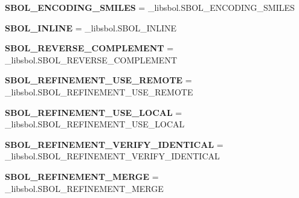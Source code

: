 \begin{DoxyCompactItemize}
\item 
{\bfseries S\+B\+O\+L\+\_\+\+E\+N\+C\+O\+D\+I\+N\+G\+\_\+\+S\+M\+I\+L\+ES} = \+\_\+libsbol.\+S\+B\+O\+L\+\_\+\+E\+N\+C\+O\+D\+I\+N\+G\+\_\+\+S\+M\+I\+L\+ES\hypertarget{namespacesbol_1_1libsbol_aba484650567bce0b94f19ad648ca8475}{}\label{namespacesbol_1_1libsbol_aba484650567bce0b94f19ad648ca8475}

\item 
{\bfseries S\+B\+O\+L\+\_\+\+I\+N\+L\+I\+NE} = \+\_\+libsbol.\+S\+B\+O\+L\+\_\+\+I\+N\+L\+I\+NE\hypertarget{namespacesbol_1_1libsbol_a00838e810a272a754e18a204914c4ebc}{}\label{namespacesbol_1_1libsbol_a00838e810a272a754e18a204914c4ebc}

\item 
{\bfseries S\+B\+O\+L\+\_\+\+R\+E\+V\+E\+R\+S\+E\+\_\+\+C\+O\+M\+P\+L\+E\+M\+E\+NT} = \+\_\+libsbol.\+S\+B\+O\+L\+\_\+\+R\+E\+V\+E\+R\+S\+E\+\_\+\+C\+O\+M\+P\+L\+E\+M\+E\+NT\hypertarget{namespacesbol_1_1libsbol_afb6eddbe7cc1189b1e00630647441892}{}\label{namespacesbol_1_1libsbol_afb6eddbe7cc1189b1e00630647441892}

\item 
{\bfseries S\+B\+O\+L\+\_\+\+R\+E\+F\+I\+N\+E\+M\+E\+N\+T\+\_\+\+U\+S\+E\+\_\+\+R\+E\+M\+O\+TE} = \+\_\+libsbol.\+S\+B\+O\+L\+\_\+\+R\+E\+F\+I\+N\+E\+M\+E\+N\+T\+\_\+\+U\+S\+E\+\_\+\+R\+E\+M\+O\+TE\hypertarget{namespacesbol_1_1libsbol_a1a0c21badc877b4cb321cbc90d69c1c2}{}\label{namespacesbol_1_1libsbol_a1a0c21badc877b4cb321cbc90d69c1c2}

\item 
{\bfseries S\+B\+O\+L\+\_\+\+R\+E\+F\+I\+N\+E\+M\+E\+N\+T\+\_\+\+U\+S\+E\+\_\+\+L\+O\+C\+AL} = \+\_\+libsbol.\+S\+B\+O\+L\+\_\+\+R\+E\+F\+I\+N\+E\+M\+E\+N\+T\+\_\+\+U\+S\+E\+\_\+\+L\+O\+C\+AL\hypertarget{namespacesbol_1_1libsbol_a5fa2a990a1a17dc52ca6d4f213063c79}{}\label{namespacesbol_1_1libsbol_a5fa2a990a1a17dc52ca6d4f213063c79}

\item 
{\bfseries S\+B\+O\+L\+\_\+\+R\+E\+F\+I\+N\+E\+M\+E\+N\+T\+\_\+\+V\+E\+R\+I\+F\+Y\+\_\+\+I\+D\+E\+N\+T\+I\+C\+AL} = \+\_\+libsbol.\+S\+B\+O\+L\+\_\+\+R\+E\+F\+I\+N\+E\+M\+E\+N\+T\+\_\+\+V\+E\+R\+I\+F\+Y\+\_\+\+I\+D\+E\+N\+T\+I\+C\+AL\hypertarget{namespacesbol_1_1libsbol_a98ca7e18e347a2f853dbac5e5b01e5ec}{}\label{namespacesbol_1_1libsbol_a98ca7e18e347a2f853dbac5e5b01e5ec}

\item 
{\bfseries S\+B\+O\+L\+\_\+\+R\+E\+F\+I\+N\+E\+M\+E\+N\+T\+\_\+\+M\+E\+R\+GE} = \+\_\+libsbol.\+S\+B\+O\+L\+\_\+\+R\+E\+F\+I\+N\+E\+M\+E\+N\+T\+\_\+\+M\+E\+R\+GE\hypertarget{namespacesbol_1_1libsbol_a02fbda1bb9397af00f5a44815e1c4abf}{}\label{namespacesbol_1_1libsbol_a02fbda1bb9397af00f5a44815e1c4abf}


\end{DoxyCompactItemize}
